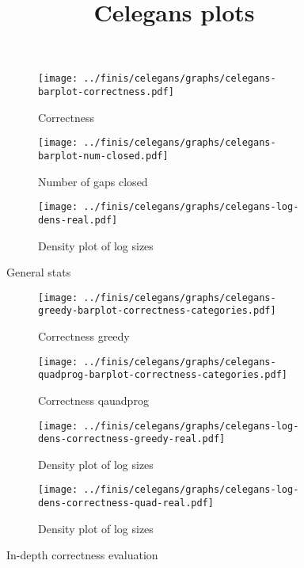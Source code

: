 \documentclass[12pt]{amsart}
\begin{document}
\title{Celegans plots}

\maketitle

\newpage
\begin{figure}[h!]
  \centering

    \begin{subfigure}{230pt}
    \centering
      \texttt{[image: ../finis/celegans/graphs/celegans-barplot-correctness.pdf]}
      \caption{Correctness}
    \end{subfigure}%
    \begin{subfigure}{230pt}
      \texttt{[image: ../finis/celegans/graphs/celegans-barplot-num-closed.pdf]}
      \caption{Number of gaps closed}
    \end{subfigure}

    \begin{subfigure}{400pt}
      \texttt{[image: ../finis/celegans/graphs/celegans-log-dens-real.pdf]}
      \caption{Density plot of log sizes}
    \end{subfigure}    

  \caption{General stats}
\end{figure}

\begin{figure}[h!]
  \centering

    \begin{subfigure}{230pt}
    \centering
      \texttt{[image: ../finis/celegans/graphs/celegans-greedy-barplot-correctness-categories.pdf]}
      \caption{Correctness greedy}
    \end{subfigure}%
    \begin{subfigure}{230pt}
      \texttt{[image: ../finis/celegans/graphs/celegans-quadprog-barplot-correctness-categories.pdf]}
      \caption{Correctness qauadprog}
    \end{subfigure}

    \begin{subfigure}{230pt}
      \texttt{[image: ../finis/celegans/graphs/celegans-log-dens-correctness-greedy-real.pdf]}
      \caption{Density plot of log sizes}
    \end{subfigure}%
    \begin{subfigure}{230pt}
      \texttt{[image: ../finis/celegans/graphs/celegans-log-dens-correctness-quad-real.pdf]}
      \caption{Density plot of log sizes}
    \end{subfigure}    

  \caption{In-depth correctness evaluation}
\end{figure}
\end{document}
